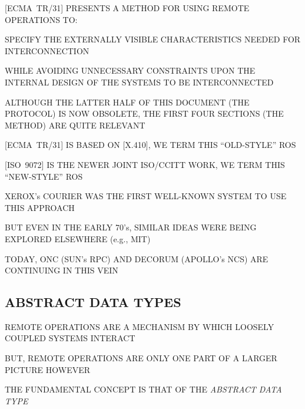 \begin{bwslide}

\begin{nrtc}
\item	{}[ECMA~TR/31] PRESENTS A METHOD FOR USING REMOTE OPERATIONS TO:
    \begin{nrtc}
    \item	SPECIFY THE EXTERNALLY VISIBLE CHARACTERISTICS
		NEEDED FOR INTERCONNECTION

    \item	WHILE AVOIDING UNNECESSARY CONSTRAINTS UPON THE
		INTERNAL DESIGN OF THE SYSTEMS TO BE INTERCONNECTED
    \end{nrtc}

\item	ALTHOUGH THE LATTER HALF OF THIS DOCUMENT (THE PROTOCOL) IS NOW
	OBSOLETE, THE FIRST FOUR SECTIONS (THE METHOD) ARE QUITE RELEVANT

\item	{}[ECMA~TR/31] IS BASED ON [X.410],
	WE TERM THIS ``OLD-STYLE'' ROS

\item	{}[ISO~9072] IS THE NEWER JOINT ISO/CCITT WORK,
	WE TERM THIS ``NEW-STYLE'' ROS
\end{nrtc}
\end{bwslide}



\begin{bwslide}

\begin{nrtc}
\item	XEROX's COURIER WAS THE FIRST WELL-KNOWN SYSTEM TO USE THIS APPROACH

\item	BUT EVEN IN THE EARLY 70's, SIMILAR IDEAS WERE BEING EXPLORED
	ELSEWHERE (e.g., MIT)

\item	TODAY, ONC (SUN's RPC) AND DECORUM (APOLLO's NCS) ARE CONTINUING IN
	THIS VEIN
\end{nrtc}
\end{bwslide}


\begin{bwslide}
\part*	{ABSTRACT DATA TYPES}\bf

\begin{nrtc}
\item	REMOTE OPERATIONS ARE A MECHANISM BY WHICH LOOSELY COUPLED SYSTEMS
	INTERACT

\item	BUT, REMOTE OPERATIONS ARE ONLY ONE PART OF A LARGER PICTURE HOWEVER

\item	THE FUNDAMENTAL CONCEPT IS THAT OF THE \emph{ABSTRACT DATA TYPE}
\end{nrtc}
\end{bwslide}


